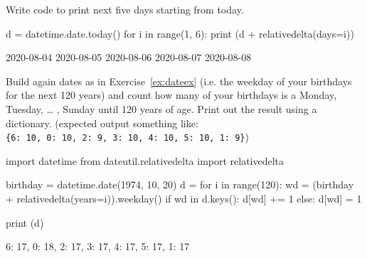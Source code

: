 \begin{question}
Write code to print next five days starting from today.
\end{question}

\cprotEnv\begin{solution}
\begin{ipython}
d = datetime.date.today()
for i in range(1, 6):
     print (d + relativedelta(days=i))
\end{ipython}
\begin{ioutput}
2020-08-04
2020-08-05
2020-08-06
2020-08-07
2020-08-08
\end{ioutput}
\end{solution}

\begin{question}
Build again dates as in Exercise~\ref{ex:dateex} (i.e. the weekday of your birthdays for the next 120 years) and count how many of your birthdays is a Monday, Tuesday, \ldots{} , Sunday until 120 years of age. Print out the result using a dictionary. (expected output something like: \texttt{\{6:\ 10,\ 0:\ 10,\ 2:\ 9,\ 3:\ 10,\ 4:\ 10,\ 5:\ 10,\ 1:\ 9\}})
\end{question}

\cprotEnv\begin{solution}
\begin{ipython}
import datetime
from dateutil.relativedelta import relativedelta

birthday = datetime.date(1974, 10, 20)
d = {}
for i in range(120):
    wd = (birthday + relativedelta(years=i)).weekday() 
    if wd in d.keys():
        d[wd] += 1
    else:
        d[wd] = 1
        
print (d)
\end{ipython}
\begin{ioutput}
{6: 17, 0: 18, 2: 17, 3: 17, 4: 17, 5: 17, 1: 17}
\end{ioutput}
\end{solution}

